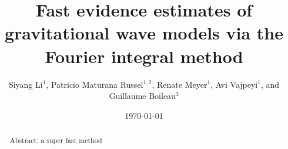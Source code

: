 \documentclass[%
 reprint,
 amsmath,amssymb,
 aps,
]{revtex4-2}
\begin{document}

\title{Fast evidence estimates of gravitational wave models via the Fourier integral method}

\author{Siyang Li$^{1}$,  Patricio Maturana Russel$^{1,2}$, Renate Meyer$^1$, Avi Vajpeyi$^1$, and Guillaume Boileau$^3$}

\newcommand{\pmr}[1]{\textcolor{purple}{[PMR: #1]}}
\newcommand{\jason}[1]{\textcolor{blue}{[jason: #1]}}
\newcommand{\avi}[1]{\textcolor{orange}{[Avi: #1]}}
\newcommand{\todo}[1]{\textcolor{olive}{TODO: #1}}
\newcommand{\citeme}{\textcolor{purple}{(cite)}}



\date{\today}%

\begin{abstract}
Abstract: a super fast method
\end{abstract}

\maketitle

\end{document}
